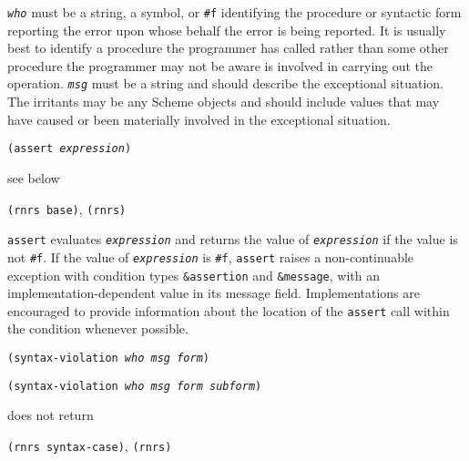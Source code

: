 \texttt{\textit{who}} must be a string, a symbol, or \texttt{\#{}f} identifying the procedure
or syntactic form reporting the error upon whose behalf the error is being
reported.
It is usually best to identify a procedure the programmer has called rather
than some other procedure the programmer may not be aware is involved in
carrying out the operation.
\texttt{\textit{msg}} must be a string and should describe the exceptional situation.
The irritants may be any Scheme objects and should include values that may
have caused or been materially involved in the exceptional situation.
\begin{description}

\label{exceptions_s5}\item[syntax] \texttt{(assert \textit{expression})}



\item[returns] see below


\item[libraries] \texttt{(rnrs base)}, \texttt{(rnrs)}
\end{description}

\texttt{assert} evaluates \texttt{\textit{expression}} and returns the value of
\texttt{\textit{expression}} if the value is not \texttt{\#{}f}.
If the value of \texttt{\textit{expression}} is \texttt{\#{}f}, \texttt{assert} raises a
non-continuable exception with condition types \texttt{\&{}assertion} and
\texttt{\&{}message}, with an implementation-dependent value in its message
field.
Implementations are encouraged to provide information about the location
of the \texttt{assert} call within the condition whenever possible.

\begin{description}

\label{exceptions_s6}\item[procedure] \texttt{(syntax-violation \textit{who} \textit{msg} \textit{form})}



\item[procedure] \texttt{(syntax-violation \textit{who} \textit{msg} \textit{form} \textit{subform})}



\item[returns] does not return


\item[libraries] \texttt{(rnrs syntax-case)}, \texttt{(rnrs)}
\end{description}


